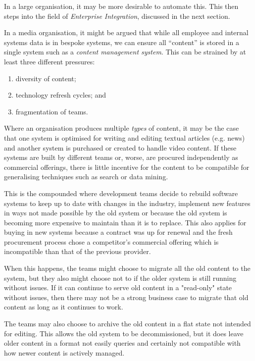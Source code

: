 In a large organisation, it may be more desirable to automate this. This then
steps into the field of \emph{Enterprise Integration}, discussed in the next
section.

In a media organisation, it might be argued that while all employee and
internal systems data is in bespoke systems, we can ensure all ``content''
is stored in a single system such as a \emph{content management system}. This
can be strained by at least three different pressures:

\begin{enumerate}
\item diversity of content;
\item technology refresh cycles; and
\item fragmentation of teams.
\end{enumerate}

Where an organisation produces multiple \emph{types} of content, it
may be the case that one system is optimised for writing and editing textual
articles (e.g. news) and another system is purchased or created to handle
video content. If these systems are built by different teams or, worse,
are procured independently as commercial offerings, there is little incentive
for the content to be compatible for generalising techniques such as search
or data mining.

This is the compounded where development teams decide to rebuild software
systems to keep up to date with changes in the industry, implement new features
in ways not made possible by the old system or because the old system is
becoming more expensive to maintain than it is to replace. This also applies
for buying in new systems because a contract was up for renewal and the fresh
procurement process chose a competitor's commercial offering which is
incompatible than that of the previous provider.

When this happens, the teams might choose to migrate all the old content to
the system, but they also might choose not to if the older system is still
running without issues. If it can continue to serve old content in a
"read-only" state without issues, then there may not be a strong business
case to migrate that old content as long as it continues to work.

The teams may also choose to archive the old content in a flat state not
intended for editing. This allows the old system to be decommissioned, but it
does leave older content in a format not easily queries and certainly not
compatible with how newer content is actively managed.

